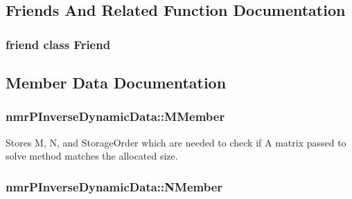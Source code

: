 \subsection{Friends And Related Function Documentation}
\hypertarget{classnmr_p_inverse_dynamic_data_a7f8321d57e81bc613d5dbef3410ba70e}{}
\subsubsection[{Friend}]{\setlength{\rightskip}{0pt plus 5cm}friend class {\bf Friend}\hspace{0.3cm}{\ttfamily [friend]}}\label{classnmr_p_inverse_dynamic_data_a7f8321d57e81bc613d5dbef3410ba70e}


\subsection{Member Data Documentation}
\hypertarget{classnmr_p_inverse_dynamic_data_a747c7b9fb8208d7a1a1b780e5fb0fb55}{}
\subsubsection[{M\+Member}]{ nmr\+P\+Inverse\+Dynamic\+Data\+::\+M\+Member\hspace{0.3cm}{\ttfamily [protected]}}\label{classnmr_p_inverse_dynamic_data_a747c7b9fb8208d7a1a1b780e5fb0fb55}
Stores M, N, and Storage\+Order which are needed to check if A matrix passed to solve method matches the allocated size. \hypertarget{classnmr_p_inverse_dynamic_data_a1ba9d083e553858b17f7ec109261223e}{}
\subsubsection[{N\+Member}]{ nmr\+P\+Inverse\+Dynamic\+Data\+::\+N\+Member\hspace{0.3cm}{\ttfamily [protected]}}\label{classnmr_p_inverse_dynamic_data_a1ba9d083e553858b17f7ec109261223e}
\hypertarget{classnmr_p_inverse_dynamic_data_ac1c4149267a493ae2077a77ebe33224a}{}
